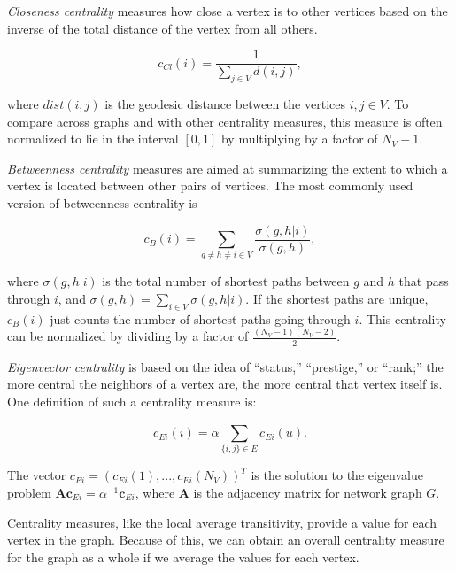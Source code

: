 \documentclass[12pt,twoside]{amherstthesis}
\begin{document}
  \emph{Closeness centrality} measures how close a vertex is to other
  vertices based on the inverse of the total distance of the vertex from
  all others.
  
  \[c_{Cl}(i) = \frac {1} {\sum_{j \in V}^{} d(i, j)},\]
  
  where \(dist(i,j)\) is the geodesic distance between the vertices
  \(i,j \in V\). To compare across graphs and with other centrality
  measures, this measure is often normalized to lie in the interval
  \([0,1]\) by multiplying by a factor of \(N_V - 1\).
  
  \emph{Betweenness centrality} measures are aimed at summarizing the
  extent to which a vertex is located between other pairs of vertices. The
  most commonly used version of betweenness centrality is
  
  \[c_{B}(i) = \sum_{g \neq h \neq i \in V}^{} \frac {\sigma(g,h|i)} {\sigma(g,h)},\]
  
  where \(\sigma(g,h|i)\) is the total number of shortest paths between
  \(g\) and \(h\) that pass through \(i\), and
  \(\sigma(g,h) = \sum_{i \in V}^{} \sigma(g,h|i)\). If the shortest paths
  are unique, \(c_{B}(i)\) just counts the number of shortest paths going
  through \(i\). This centrality can be normalized by dividing by a factor
  of \(\frac {(N_V - 1)(N_V - 2)} {2}\).
  
  \emph{Eigenvector centrality} is based on the idea of ``status,''
  ``prestige,'' or ``rank;'' the more central the neighbors of a vertex
  are, the more central that vertex itself is. One definition of such a
  centrality measure is:
  
  \[c_{Ei}(i) = \alpha \sum_{\{i,j\} \in E}^{} c_{Ei} (u).\]
  
  The vector \(c_{Ei} = (c_{Ei}(1), ..., c_{Ei}(N_V))^T\) is the solution
  to the eigenvalue problem
  \(\textbf{A}\textbf{c}_{Ei} = \alpha^{-1}\textbf{c}_{Ei}\), where
  \(\textbf{A}\) is the adjacency matrix for network graph \(G\).
  
  Centrality measures, like the local average transitivity, provide a
  value for each vertex in the graph. Because of this, we can obtain an
  overall centrality measure for the graph as a whole if we average the
  values for each vertex.
  
\end{document}
